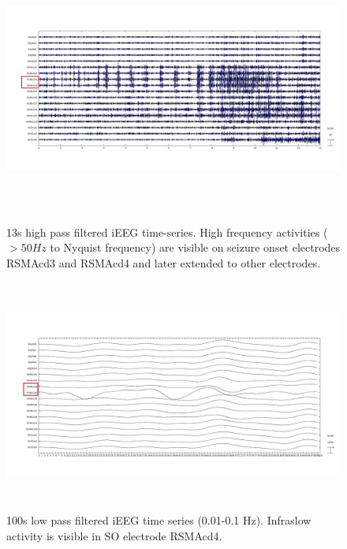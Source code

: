 \begin{figure}

\centerline{
	\includegraphics[height =3.5in]{Plots/Patient_C_HFO_Filtered.jpg}
	}
	\caption{13s high pass filtered iEEG time-series. High frequency activities ($> 50 Hz$ to Nyquist frequency) are visible on seizure onset electrodes RSMAcd3 and RSMAcd4 and later extended to other electrodes.}
	\label{fig:high_pass_filtered_preictal_patient_c}
\end{figure}


\begin{figure}
\centerline{
	\includegraphics[height =3in]{Plots/Patient_C_infraslow_100s.jpg}
	}
	\caption{100s low pass filtered iEEG time series (0.01-0.1 Hz). Infraslow activity is visible in SO electrode RSMAcd4.}
	\label{fig:infraslow_wave_patient_c}
\end{figure}



